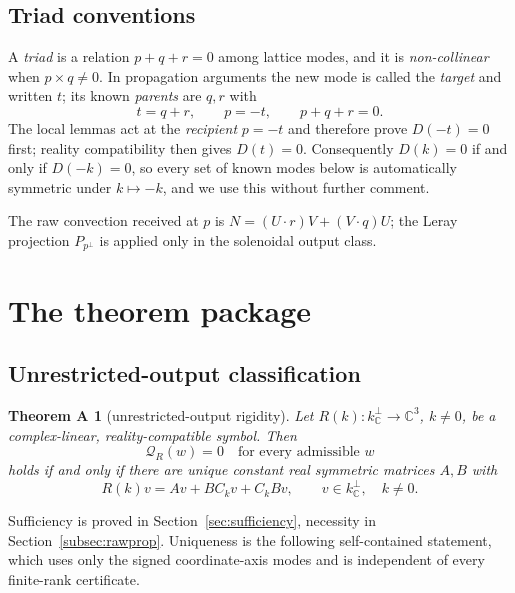 \documentclass[11pt]{article}
\theoremstyle{definition}
\theoremstyle{remark}
\theoremstyle{plain}
\newtheorem*{thmA}{Theorem A}
\newcommand{\C}{\mathbb{C}}
\newcommand{\Qform}{\mathcal{Q}}
\newcommand{\Ck}{C_k}
\newcommand{\kperp}{k_{\C}^{\perp}}
\begin{document}
\subsection{Triad conventions}

A \emph{triad} is a relation $p+q+r=0$ among lattice modes, and it is
\emph{non-collinear} when $p\times q\ne0$. In propagation arguments the new
mode is called the \emph{target} and written $t$; its known \emph{parents} are
$q,r$ with
\begin{equation}
\label{eq:targetconv}
t=q+r,
\qquad
p=-t,
\qquad
p+q+r=0 .
\end{equation}
The local lemmas act at the \emph{recipient} $p=-t$ and therefore prove
$D(-t)=0$ first; reality compatibility then gives $D(t)=0$. Consequently
$D(k)=0$ if and only if $D(-k)=0$, so every set of known modes below is
automatically symmetric under $k\mapsto-k$, and we use this without further
comment.

The raw convection received at $p$ is
$N=(U\cdot r)V+(V\cdot q)U$; the Leray projection $P_{p^{\perp}}$ is applied
only in the solenoidal output class.

\section{The theorem package}
\label{sec:results}

\subsection{Unrestricted-output classification}
\label{subsec:thmA}

\begin{thmA}[unrestricted-output rigidity]
\label{thm:A}
Let $R(k):\kperp\to\C^{3}$, $k\ne0$, be a complex-linear, reality-compatible
symbol. Then
\begin{equation}
\label{eq:universal}
\Qform_{R}(w)=0
\quad\text{for every admissible }w
\end{equation}
holds if and only if there are unique constant real symmetric matrices $A,B$
with
\begin{equation}
\label{eq:generator}
R(k)v=Av+B\Ck v+\Ck Bv,
\qquad v\in\kperp,\quad k\ne0 .
\end{equation}
\end{thmA}

Sufficiency is proved in Section~\ref{sec:sufficiency}, necessity in
Section~\ref{subsec:rawprop}. Uniqueness is the following self-contained
statement, which uses only the signed coordinate-axis modes and is independent
of every finite-rank certificate.
\end{document}
